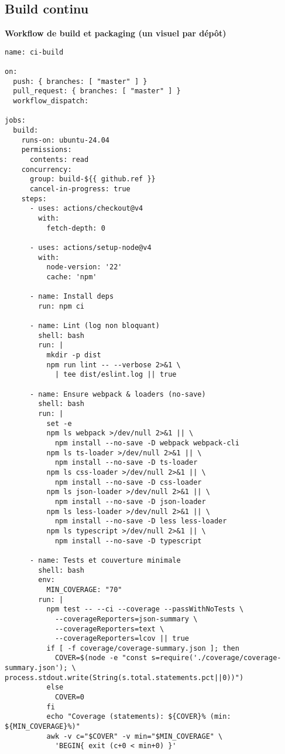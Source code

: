 \subsection{Build continu}
\label{subsec:ci-build}

\noindent\textbf{Workflow de build et packaging (un visuel par dépôt)}
\begin{verbatim}
name: ci-build

on:
  push: { branches: [ "master" ] }
  pull_request: { branches: [ "master" ] }
  workflow_dispatch:

jobs:
  build:
    runs-on: ubuntu-24.04
    permissions:
      contents: read
    concurrency:
      group: build-${{ github.ref }}
      cancel-in-progress: true
    steps:
      - uses: actions/checkout@v4
        with:
          fetch-depth: 0

      - uses: actions/setup-node@v4
        with:
          node-version: '22'
          cache: 'npm'

      - name: Install deps
        run: npm ci

      - name: Lint (log non bloquant)
        shell: bash
        run: |
          mkdir -p dist
          npm run lint -- --verbose 2>&1 \
            | tee dist/eslint.log || true

      - name: Ensure webpack & loaders (no-save)
        shell: bash
        run: |
          set -e
          npm ls webpack >/dev/null 2>&1 || \
            npm install --no-save -D webpack webpack-cli
          npm ls ts-loader >/dev/null 2>&1 || \
            npm install --no-save -D ts-loader
          npm ls css-loader >/dev/null 2>&1 || \
            npm install --no-save -D css-loader
          npm ls json-loader >/dev/null 2>&1 || \
            npm install --no-save -D json-loader
          npm ls less-loader >/dev/null 2>&1 || \
            npm install --no-save -D less less-loader
          npm ls typescript >/dev/null 2>&1 || \
            npm install --no-save -D typescript

      - name: Tests et couverture minimale
        shell: bash
        env:
          MIN_COVERAGE: "70"
        run: |
          npm test -- --ci --coverage --passWithNoTests \
            --coverageReporters=json-summary \
            --coverageReporters=text \
            --coverageReporters=lcov || true
          if [ -f coverage/coverage-summary.json ]; then
            COVER=$(node -e "const s=require('./coverage/coverage-summary.json'); \
process.stdout.write(String(s.total.statements.pct||0))")
          else
            COVER=0
          fi
          echo "Coverage (statements): ${COVER}% (min: ${MIN_COVERAGE}%)"
          awk -v c="$COVER" -v min="$MIN_COVERAGE" \
            'BEGIN{ exit (c+0 < min+0) }'


\end{verbatim}
